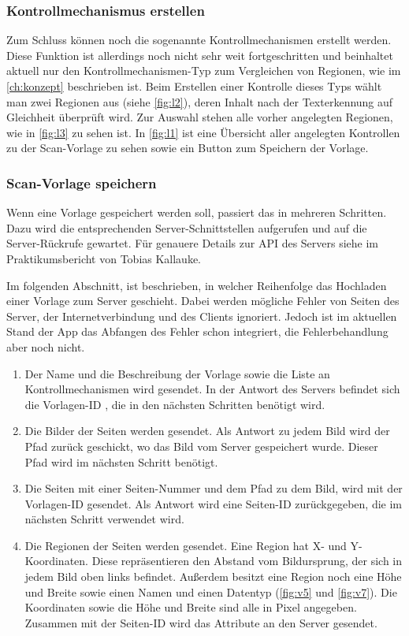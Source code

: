 \documentclass[notables, nomenclature, oneside, 150]{HSMW-Thesis}
\begin{document}
			\subsubsection*{Kontrollmechanismus erstellen}
			Zum Schluss können noch die sogenannte Kontrollmechanismen erstellt werden. Diese Funktion ist allerdings noch nicht sehr weit fortgeschritten und beinhaltet aktuell nur den Kontrollmechanismen-Typ zum Vergleichen von Regionen, wie im \autoref{ch:konzept} beschrieben ist. Beim Erstellen einer Kontrolle dieses Typs wählt man zwei Regionen aus (siehe \autoref{fig:l2}), deren Inhalt nach der Texterkennung auf Gleichheit überprüft wird. Zur Auswahl stehen alle vorher angelegten Regionen, wie in \autoref{fig:l3} zu sehen ist. In \autoref{fig:l1} ist eine Übersicht aller angelegten Kontrollen zu der Scan-Vorlage zu sehen sowie ein Button zum Speichern der Vorlage.

			\subsubsection*{Scan-Vorlage speichern}
			Wenn eine Vorlage gespeichert werden soll, passiert das in mehreren Schritten. Dazu wird die entsprechenden Server-Schnittstellen aufgerufen und auf die Server-Rückrufe gewartet. Für genauere Details zur API des Servers siehe im Praktikumsbericht von Tobias Kallauke.
			
			Im folgenden Abschnitt, ist beschrieben, in welcher Reihenfolge das Hochladen einer Vorlage zum Server geschieht. Dabei werden mögliche Fehler von Seiten des Server, der Internetverbindung und des Clients ignoriert. Jedoch ist im aktuellen Stand der App das Abfangen des Fehler schon integriert, die Fehlerbehandlung aber noch nicht.
			\begin{enumerate}
				\item Der Name und die Beschreibung der Vorlage sowie die Liste an Kontrollmechanismen wird gesendet. In der Antwort des Servers befindet sich  die Vorlagen-ID , die in den nächsten Schritten benötigt wird. 
				\item Die Bilder der Seiten werden gesendet. Als Antwort zu jedem Bild wird der Pfad zurück geschickt, wo das Bild vom Server gespeichert wurde. Dieser Pfad wird im nächsten Schritt benötigt.
				\item Die Seiten mit einer Seiten-Nummer und dem Pfad zu dem Bild, wird mit der Vorlagen-ID gesendet. Als Antwort wird eine Seiten-ID zurückgegeben, die im nächsten Schritt verwendet wird.
				\item Die Regionen der Seiten werden gesendet. Eine Region hat X- und Y-Koordinaten. Diese repräsentieren den Abstand vom Bildursprung, der sich in jedem Bild oben links befindet. Außerdem besitzt eine Region noch eine Höhe und Breite sowie einen Namen und einen Datentyp (\ref{fig:v5} und \ref{fig:v7}). Die Koordinaten sowie die Höhe und Breite sind alle in Pixel angegeben. Zusammen mit der Seiten-ID wird das Attribute an den Server gesendet.
			\end{enumerate}
			
\end{document}
